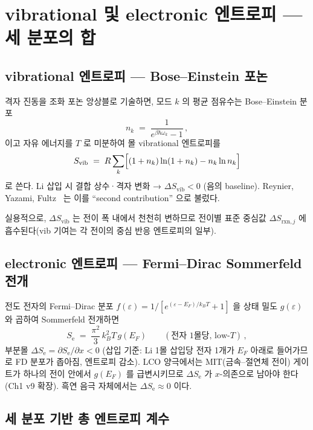 \documentclass[11pt,a4paper]{article}
\newcommand{\rxn}{\mathrm{rxn}}
\newcommand{\vib}{\mathrm{vib}}
\newcommand{\elec}{\mathrm{e}}
\begin{document}
\section{vibrational 및 electronic 엔트로피 — 세 분포의 합}\label{sec:vib_elec}

\subsection{vibrational 엔트로피 — Bose--Einstein 포논}

격자 진동을 조화 포논 앙상블로 기술하면, 모드 $k$ 의 평균 점유수는
Bose--Einstein 분포
\[
  n_k \;=\; \frac{1}{e^{\beta\hbar\omega_k}-1}\,,
\]
이고 자유 에너지를 $T$ 로 미분하여 몰 vibrational 엔트로피를
\begin{equation}
  S_\vib \;=\; R\sum_k\Bigl[(1+n_k)\ln(1+n_k) - n_k\ln n_k\Bigr]
  \label{eq:Svib}
\end{equation}
로 쓴다. Li 삽입 시 결합 상수·격자 변화 → $\Delta S_\vib<0$ (음의 baseline).
Reynier, Yazami, Fultz~\cite{reynier2003} 는 이를 ``second contribution'' 으로 불렀다.

실용적으로, $\Delta S_\vib$ 는 전이 폭 내에서 천천히 변하므로 전이별 표준 중심값
$\Delta S_{\rxn,j}$ 에 흡수된다(vib 기여는 각 전이의 중심 반응 엔트로피의 일부).

\subsection{electronic 엔트로피 — Fermi--Dirac Sommerfeld 전개}

전도 전자의 Fermi--Dirac 분포
$f(\varepsilon)=1/[e^{(\varepsilon-E_F)/k_BT}+1]$
을 상태 밀도 $g(\varepsilon)$ 와 곱하여 Sommerfeld 전개하면
\begin{equation}
  S_\elec \;=\; \frac{\pi^2}{3}\,k_B^2 T\,g(E_F)
  \qquad (\text{전자 1몰당, low-}T)\,,
  \label{eq:Selec}
\end{equation}
부분몰 $\Delta S_\elec=\partial S_\elec/\partial x<0$ (삽입 기준: Li 1몰 삽입당 전자 1개가
$E_F$ 아래로 들어가므로 FD 분포가 좁아짐, 엔트로피 감소).
LCO 양극에서는 MIT(금속--절연체 전이) 게이트가 하나의 전이 안에서 $g(E_F)$ 를 급변시키므로
$\Delta S_\elec$ 가 $x$-의존으로 남아야 한다 (Ch1 v9 확장). 흑연 음극 자체에서는
$\Delta S_\elec\approx0$ 이다.

\subsection{세 분포 기반 총 엔트로피 계수}
\end{document}
